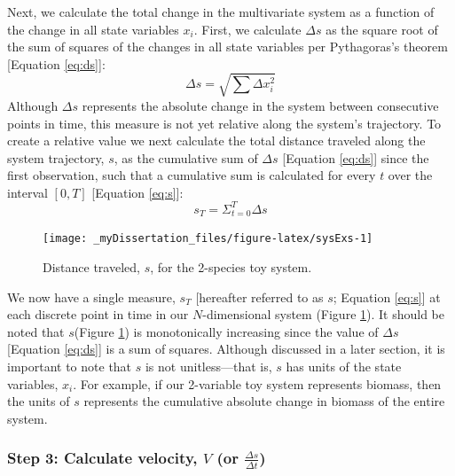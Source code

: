 \documentclass[12pt,twoside,openany]{reedthesis}
\begin{document}
Next, we calculate the total change in the multivariate system as a function of the change in all state variables \(x_i\). First, we calculate \(\Delta s\) as the square root of the sum of squares of the changes in all state variables per Pythagoras's theorem {[}Equation \eqref{eq:ds}{]}:
\begin{equation}
\Delta s = \sqrt{\sum{\Delta x_i^2}}
\label{eq:ds}
\end{equation}
Although \(\Delta s\) represents the absolute change in the system between consecutive points in time, this measure is not yet relative along the system's trajectory. To create a relative value we next calculate the total distance traveled along the system trajectory, \(s\), as the cumulative sum of \(\Delta s\) {[}Equation \eqref{eq:ds}{]} since the first observation, such that a cumulative sum is calculated for every \(t\) over the interval \([0,T]\) {[}Equation \eqref{eq:s}{]}:
\begin{equation}
s_T = \Sigma_{t=0}^{T}{\Delta s}
  \label{eq:s}
\end{equation}
\begin{figure}
\texttt{[image: \_myDissertation\_files/figure-latex/sysExs-1]} \caption{Distance traveled, $s$, for the 2-species toy system.}\label{fig:sysExs}
\end{figure}
We now have a single measure, \(s_T\) {[}hereafter referred to as \(s\); Equation \eqref{eq:s}{]} at each discrete point in time in our \(N\)-dimensional system (Figure \ref{fig:sysExs}). It should be noted that \(s\)(Figure \ref{fig:sysExs}) is monotonically increasing since the value of \(\Delta s\) {[}Equation \eqref{eq:ds}{]} is a sum of squares. Although discussed in a later section, it is important to note that \(s\) is not unitless---that is, \(s\) has units of the state variables, \(x_i\). For example, if our 2-variable toy system represents biomass, then the units of \(s\) represents the cumulative absolute change in biomass of the entire system.

\hypertarget{step-3-calculate-velocity-v-or-fracdelta-sdelta-t}{%
\subsubsection{\texorpdfstring{Step 3: Calculate velocity, \(V\) (or \(\frac{\Delta s}{\Delta t}\))}{Step 3: Calculate velocity, V (or \textbackslash frac\{\textbackslash Delta s\}\{\textbackslash Delta t\})}}\label{step-3-calculate-velocity-v-or-fracdelta-sdelta-t}}
\end{document}
